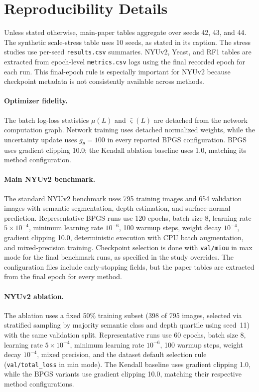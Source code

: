 \section{Reproducibility Details}
\label{app:reproducibility}
Unless stated otherwise, main-paper tables aggregate over seeds 42, 43, and 44. The synthetic scale-stress table uses 10 seeds, as stated in its caption. The stress studies use per-seed \texttt{results.csv} summaries. NYUv2, Yeast, and RF1 tables are extracted from epoch-level \texttt{metrics.csv} logs using the final recorded epoch for each run. This final-epoch rule is especially important for NYUv2 because checkpoint metadata is not consistently available across methods.

\paragraph{Optimizer fidelity.}
The batch log-loss statistics $\mu(L)$ and $\bar\varsigma(L)$ are detached from the network
computation graph. Network training uses detached normalized weights, while the uncertainty
update uses $g_\theta=100$ in every reported BPGS configuration. BPGS uses gradient clipping 10.0;
the Kendall ablation baseline uses 1.0, matching its method configuration.

\paragraph{Main NYUv2 benchmark.}
The standard NYUv2 benchmark uses 795 training images and 654 validation images with semantic segmentation, depth estimation, and surface-normal prediction. Representative BPGS runs use 120 epochs, batch size 8, learning rate $5\times 10^{-4}$, minimum learning rate $10^{-6}$, 100 warmup steps, weight decay $10^{-4}$, gradient clipping 10.0, deterministic execution with CPU batch augmentation, and mixed-precision training. Checkpoint selection is done with \texttt{val/miou} in max mode for the final benchmark runs, as specified in the study overrides. The configuration files include early-stopping fields, but the paper tables are extracted from the final epoch for every method.

\paragraph{NYUv2 ablation.}
The ablation uses a fixed 50\% training subset (398 of 795 images, selected via stratified sampling by majority semantic class and depth quartile using seed~11) with the same validation split. Representative runs use 60 epochs, batch size 8, learning rate $5\times 10^{-4}$, minimum learning rate $10^{-6}$, 100 warmup steps, weight decay $10^{-4}$, mixed precision, and the dataset default selection rule (\texttt{val/total\_loss} in min mode). The Kendall baseline uses gradient clipping 1.0, while the BPGS variants use gradient clipping 10.0, matching their respective method configurations.

